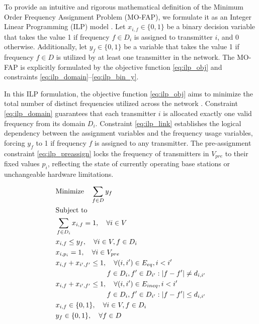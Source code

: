 \documentclass[letterpaper,journal]{IEEEtran}
\begin{document}
To provide an intuitive and rigorous mathematical definition of the Minimum Order Frequency Assignment Problem (MO-FAP), we formulate it as an Integer Linear Programming (ILP) model \cite{Aardal2007}. Let $x_{i,f} \in \{0, 1\}$ be a binary decision variable that takes the value 1 if frequency $f \in D_i$ is assigned to transmitter $i$, and 0 otherwise. Additionally, let $y_f \in \{0, 1\}$ be a variable that takes the value 1 if frequency $f \in D$ is utilized by at least one transmitter in the network. The MO-FAP is explicitly formulated by the objective function \eqref{eq:ilp_obj} and constraints \eqref{eq:ilp_domain}--\eqref{eq:ilp_bin_y}.

In this ILP formulation, the objective function \eqref{eq:ilp_obj} aims to minimize the total number of distinct frequencies utilized across the network \cite{Aardal2007}. Constraint \eqref{eq:ilp_domain} guarantees that each transmitter $i$ is allocated exactly one valid frequency from its domain $D_i$. Constraint \eqref{eq:ilp_link} establishes the logical dependency between the assignment variables and the frequency usage variables, forcing $y_f$ to 1 if frequency $f$ is assigned to any transmitter. The pre-assignment constraint \eqref{eq:ilp_preassign} locks the frequency of transmitters in $V_{pre}$ to their fixed values $p_i$, reflecting the state of currently operating base stations or unchangeable hardware limitations.

\begin{align}
    & \text{Minimize} \quad \sum_{f \in D} y_f \label{eq:ilp_obj} \\
    & \text{Subject to} \notag \\
    & \sum_{f \in D_i} x_{i,f} = 1, \quad \forall i \in V \label{eq:ilp_domain} \\
    & x_{i,f} \le y_f, \quad \forall i \in V, f \in D_i \label{eq:ilp_link} \\
    & x_{i, p_i} = 1, \quad \forall i \in V_{pre} \label{eq:ilp_preassign} \\
    & x_{i,f} + x_{i',f'} \le 1, \quad \forall (i, i') \in E_{eq}, i < i' \notag \\
    & \qquad \qquad \qquad \quad \; f \in D_i, f' \in D_{i'} : |f - f'| \neq d_{i,i'} \label{eq:ilp_exact} \\
    & x_{i,f} + x_{i',f'} \le 1, \quad \forall (i, i') \in E_{ineq}, i < i' \notag \\
    & \qquad \qquad \qquad \quad \; f \in D_i, f' \in D_{i'} : |f - f'| \le d_{i,i'} \label{eq:ilp_ineq} \\
    & x_{i,f} \in \{0, 1\}, \quad \forall i \in V, f \in D_i \label{eq:ilp_bin_x} \\
    & y_f \in \{0, 1\}, \quad \forall f \in D \label{eq:ilp_bin_y}
\end{align}
\end{document}
